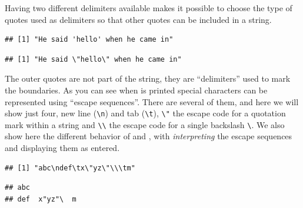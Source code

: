 \documentclass[krantz2]{krantz}\usepackage{knitr}
\begin{document}
Having two different delimiters available makes it possible to choose the type of quotes used as delimiters so that other quotes can be included in a string.

\begin{knitrout}\footnotesize
{}\color{fgcolor}\begin{kframe}
\begin{alltt}
 \hlkwb{<-} 
\end{alltt}
\begin{verbatim}
## [1] "He said 'hello' when he came in"
\end{verbatim}
\begin{alltt}
 \hlkwb{<-} 
\end{alltt}
\begin{verbatim}
## [1] "He said \"hello\" when he came in"
\end{verbatim}
\end{kframe}
\end{knitrout}

The outer quotes are not part of the string, they are ``delimiters'' used to mark the boundaries. As you can see when  is printed special characters can be represented using ``escape sequences''. There are several of them, and here we will show just four, new line (\verb|\n|) and tab (\verb|\t|), \verb|\"| the escape code for a quotation mark within a string and \verb|\\| the escape code for a single backslash \verb|\|. We also show here the different behavior of  and , with  \emph{interpreting} the escape sequences and  displaying them as entered.

\begin{knitrout}\footnotesize
{}\color{fgcolor}\begin{kframe}
\begin{alltt}
 \hlkwb{<-} 
\end{alltt}
\begin{verbatim}
## [1] "abc\ndef\tx\"yz\"\\\tm"
\end{verbatim}
\begin{alltt}
\end{alltt}
\begin{verbatim}
## abc
## def	x"yz"\	m
\end{verbatim}
\end{kframe}
\end{knitrout}
\end{document}
